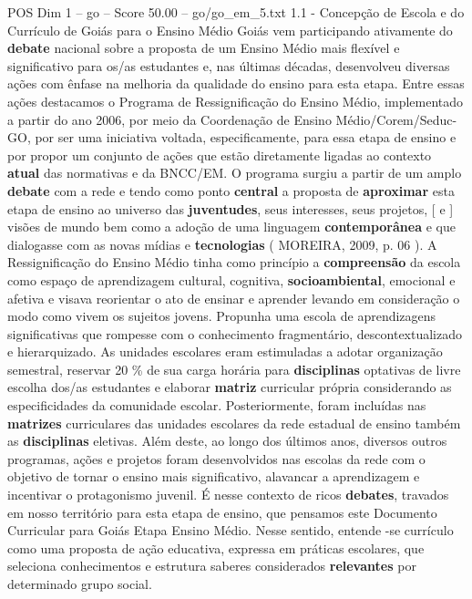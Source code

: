 \begin{textsample}{POS Dim 1 – go – Score 50.00 – go/go\_em\_5.txt}  \label{ex:f1_pos_098}
1.1 - Concepção de Escola e do Currículo de Goiás para o Ensino Médio Goiás vem participando ativamente do \textbf{debate} nacional sobre a proposta de um Ensino Médio mais flexível e significativo para os/as estudantes e, nas últimas décadas, desenvolveu diversas ações com ênfase na melhoria da qualidade do ensino para esta etapa.
Entre essas ações destacamos o Programa de Ressignificação do Ensino Médio, implementado a partir do ano 2006, por meio da Coordenação de Ensino Médio/Corem/Seduc-GO, por ser uma iniciativa voltada, especificamente, para essa etapa de ensino e por propor um conjunto de ações que estão diretamente ligadas ao contexto \textbf{atual} das normativas e da BNCC/EM.
O programa surgiu a partir de um amplo \textbf{debate} com a rede e tendo como ponto \textbf{central} a proposta de \textbf{aproximar} esta etapa de ensino ao universo das \textbf{juventudes}, seus interesses, seus projetos, [ e ] visões de mundo bem como a adoção de uma linguagem \textbf{contemporânea} e que dialogasse com as novas mídias e \textbf{tecnologias} ( MOREIRA, 2009, p. 06 ).
A Ressignificação do Ensino Médio tinha como princípio a \textbf{compreensão} da escola como espaço de aprendizagem cultural, cognitiva, \textbf{socioambiental}, emocional e afetiva e visava reorientar o ato de ensinar e aprender levando em consideração o modo como vivem os sujeitos jovens.
Propunha uma escola de aprendizagens significativas que rompesse com o conhecimento fragmentário, descontextualizado e hierarquizado.
As unidades escolares eram estimuladas a adotar organização semestral, reservar 20 \% de sua carga horária para \textbf{disciplinas} optativas de livre escolha dos/as estudantes e elaborar \textbf{matriz} curricular própria considerando as especificidades da comunidade escolar.
Posteriormente, foram incluídas nas \textbf{matrizes} curriculares das unidades escolares da rede estadual de ensino também as \textbf{disciplinas} eletivas.
Além deste, ao longo dos últimos anos, diversos outros programas, ações e projetos foram desenvolvidos nas escolas da rede com o objetivo de tornar o ensino mais significativo, alavancar a aprendizagem e incentivar o protagonismo juvenil.
É nesse contexto de ricos \textbf{debates}, travados em nosso território para esta etapa de ensino, que pensamos este Documento Curricular para Goiás Etapa Ensino Médio.
Nesse sentido, entende -se currículo como uma proposta de ação educativa, expressa em práticas escolares, que seleciona conhecimentos e estrutura saberes considerados \textbf{relevantes} por determinado grupo social.

\end{textsample}
